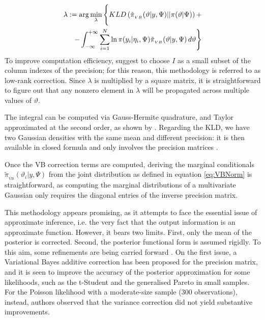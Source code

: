 \documentclass[openany, 11pt, oneside]{book}
\begin{document}
\begin{equation}
\begin{aligned}
\lambda := \arg \min_{\lambda} \Bigg{\lbrace}
KLD\left( \tilde{\pi}_{_{VB}}(\vartheta \vert y, \Psi) \vert \vert \pi(\vartheta \vert \Psi)\right) + \\
-\int_{-\infty}^{+\infty}  \sum_{i=1}^{N} \ln\pi(y_i \vert \eta_i, \Psi) \tilde{\pi}_{_{VB}}(\vartheta \vert y, \Psi)\, d \vartheta \Bigg{\rbrace}
\label{VBINLA}
\end{aligned}
\end{equation}
To improve computation efficiency, \cite{VBINLA2024} suggest to choose $I$ as a small subset of the column indexes of the precision; for this reason, this methodology is referred to as low-rank correction. Since $\lambda$ is multiplied by a square matrix, it is straightforward to figure out that any nonzero element in $\lambda$ will be propagated across multiple values of $\vartheta$.

The integral can be computed via Gauss-Hermite quadrature, and Taylor approximated at the second order, as shown by \cite{VBINLA2024}. Regarding the KLD, we have two Gaussian densities with the same mean and different precision: it is then available in closed formula and only involves the precision matrices \parencite{PC}. 

Once the VB correction terms are computed, deriving the marginal conditionals $\tilde{\pi}_\mathrm{_{VB}}(\vartheta_i \vert y, \Psi)$ from the joint distribution as defined in equation \ref{eq:VBNorm} is straightforward, as computing the marginal distributions of a multivariate Gaussian only requires the diagonal entries of the inverse precision matrix.

This methodology appears promising, as it attempts to face the essential issue of approximate inference, i.e. the very fact that the output information is an approximate function. However, it bears two limits. First, only the mean of the posterior is corrected. Second, the posterior functional form is assumed rigidly. To this aim, some refinements are being carried forward \parencite{dutta2025scalable}. On the first issue, a Variational Bayes additive correction has been proposed for the precision matrix, and it is seen to improve the accuracy of the posterior approximation for some likelihoods, such as the t-Student and the generalised Pareto in small samples. For the Poisson likelihood with a moderate-size sample (300 observations), instead, authors observed that the variance correction did not yield substantive improvements. 
\end{document}
